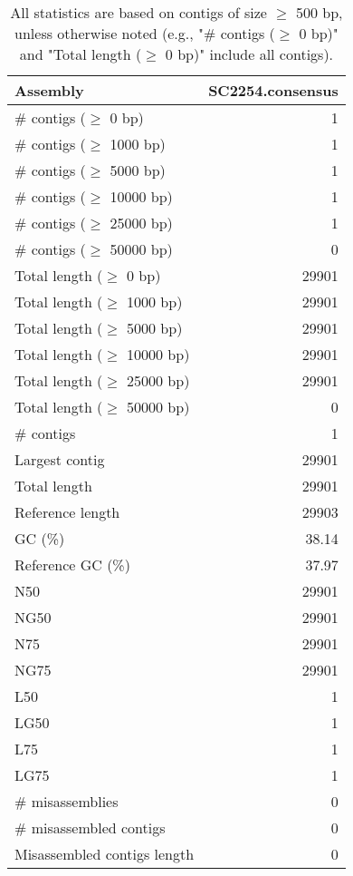 \documentclass[12pt,a4paper]{article}
\begin{document}
\begin{table}[ht]
\begin{center}
\caption{All statistics are based on contigs of size $\geq$ 500 bp, unless otherwise noted (e.g., "\# contigs ($\geq$ 0 bp)" and "Total length ($\geq$ 0 bp)" include all contigs).}
\begin{tabular}{|l*{1}{|r}|}
\hline
Assembly & SC2254.consensus \\ \hline
\# contigs ($\geq$ 0 bp) & 1 \\ \hline
\# contigs ($\geq$ 1000 bp) & 1 \\ \hline
\# contigs ($\geq$ 5000 bp) & 1 \\ \hline
\# contigs ($\geq$ 10000 bp) & 1 \\ \hline
\# contigs ($\geq$ 25000 bp) & 1 \\ \hline
\# contigs ($\geq$ 50000 bp) & 0 \\ \hline
Total length ($\geq$ 0 bp) & 29901 \\ \hline
Total length ($\geq$ 1000 bp) & 29901 \\ \hline
Total length ($\geq$ 5000 bp) & 29901 \\ \hline
Total length ($\geq$ 10000 bp) & 29901 \\ \hline
Total length ($\geq$ 25000 bp) & 29901 \\ \hline
Total length ($\geq$ 50000 bp) & 0 \\ \hline
\# contigs & 1 \\ \hline
Largest contig & 29901 \\ \hline
Total length & 29901 \\ \hline
Reference length & 29903 \\ \hline
GC (\%) & 38.14 \\ \hline
Reference GC (\%) & 37.97 \\ \hline
N50 & 29901 \\ \hline
NG50 & 29901 \\ \hline
N75 & 29901 \\ \hline
NG75 & 29901 \\ \hline
L50 & 1 \\ \hline
LG50 & 1 \\ \hline
L75 & 1 \\ \hline
LG75 & 1 \\ \hline
\# misassemblies & 0 \\ \hline
\# misassembled contigs & 0 \\ \hline
Misassembled contigs length & 0 \\ \hline

\end{tabular}
\end{center}
\end{table}
\end{document}
